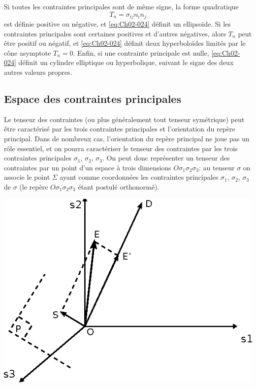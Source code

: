 Si toutes les contraintes principales sont de même signe, la forme quadratique 
\begin{equation}
    T_n = \sigma_{ij} n_i n_j
    \label{eq:Ch02-026}
\end{equation}
est définie positive ou négative, et \eqref{eq:Ch02-024} définit un ellipsoïde.
Si les contraintes principales sont certaines positives et d'autres négatives, alors $T_n$ peut être positif ou négatif, et \eqref{eq:Ch02-024} définit deux hyperboloïdes limités par le cône asymptote $T_n = 0$.
Enfin, si une contrainte principale est nulle, \eqref{eq:Ch02-024} définit un cylindre elliptique ou hyperbolique, suivant le signe des deux autres valeurs propres. 
\subsection{Espace des contraintes principales} \label{ssec:Ch02-2.2}
Le tenseur des contraintes (ou plus généralement tout tenseur symétrique) peut être caractérisé par les trois contraintes principales et l'orientation du repère principal.
Dans de nombreux cas, l'orientation du repère principal ne joue pas un rôle essentiel, et on pourra caractériser le tenseur des contraintes par les trois contraintes principales $\sigma_1$, $\sigma_2$, $\sigma_3$.
On peut donc représenter un tenseur des contraintes par un point d'un espace à trois dimensions $O\sigma_1\sigma_2\sigma_3$: au tenseur $\mathbb{\sigma}$ on associe le point $\Sigma$ ayant comme coordonnées les contraintes principales $\sigma_1$, $\sigma_2$, $\sigma_3$ de $\mathbb{\sigma}$ (le repère $O\sigma_1\sigma_2\sigma_3$ étant postulé orthonormé).

    \begin{center}
        \includegraphics{../images/T1_Ch02-0012}
    \end{center}

